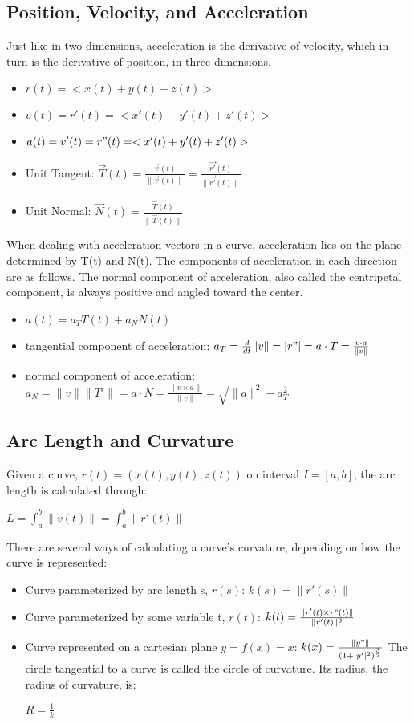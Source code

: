 \documentclass [12 pt, oneside] {book}
\begin{document}
\subsection{Position, Velocity, and Acceleration}
Just like in two dimensions, acceleration is the derivative of velocity, which in turn is the derivative of position, in three dimensions.
\begin{itemize}
	\item $r(t)=<x (t) + y(t) + z(t)>$
\item $v(t)=r'(t)=<x'(t) + y'(t) + z'(t)>$
\item $a(t)=v'(t)=r"(t)=<x'(t) + y'(t) + z'(t)>$
\item Unit Tangent: $\vec{T}(t)=\frac{\vec{v}(t)}{\|\vec{v}(t)\|}=\frac{\vec{r'}(t)}{\|\vec{r'}(t)\|}$
\item Unit Normal: $\vec{N}(t)=\frac{\vec{T}(t)}{\|\vec{T}(t)\|}$
\end{itemize}
When dealing with acceleration vectors in a curve, acceleration lies on the plane determined by T(t) and N(t). The components of acceleration in each direction are as follows. The normal component of acceleration, also called the centripetal component, is always positive and angled toward the center.
\begin{itemize}
\item $a(t) = a_TT(t) + a_NN(t)$
\item tangential component of acceleration: $a_T = \frac{d}{dt}\|v\| = |r"| = a\cdot T = \frac{v\cdot a}{\|v\|}$
\item normal component of acceleration: $a_N = \|v\|\|T'\| = a\cdot N = \frac{\|v\times a\|}{\|v\|}=\sqrt{\|a\|^2-a_T^2}$
\end{itemize}
\subsection{Arc Length and Curvature}
Given a curve, $r(t)=(x(t),y(t),z(t))$ on interval $I=[a,b]$, the arc length is calculated through:
\begin{center}$L=\int_{a}^{b}\|v(t)\| = \int_{a}^{b}\|r'(t)\|$ \end{center}
There are several ways of calculating a curve's curvature, depending on how the curve is represented:
\begin{itemize}
\item Curve parameterized by arc length s, $r(s)$: $k(s)=\|r'(s)\|$
\item Curve parameterized by some variable t, $r(t)$: $k(t)=\frac{\|r'(t)\times r"(t)\|}{\|r'(t)\|^3}$
\item Curve represented on a cartesian plane $y=f(x)=x$: $k(x)=\frac{\|y"\|}{(1+|y'|^2)^{\frac{3}{2}}}$
The circle tangential to a curve is called the circle of curvature. Its radius, the radius of curvature, is:
\begin{center}$R=\frac{1}{k}$\end{center}
\end{itemize}
\end{document}
